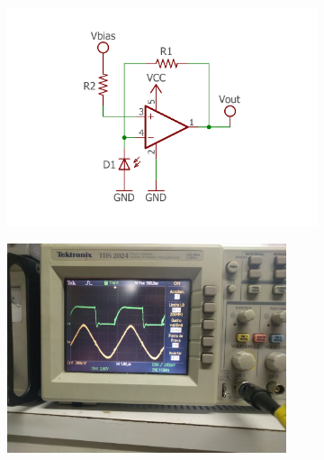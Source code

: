 	\begin{figure}[h]
		\caption{\label{fig_transimpedance_amp_complex_outer}Circuito e saída de um amplificador de impedâncias. No circuito, o fotodiodo é reversamente polarizado por $V_{bias}$. No osciloscópio, a saída está marcada em amarelo enquanto a saída do LED está em verde.}
		\begin{subfigure}{.5\textwidth}
			\centering
			\includegraphics[width=1\textwidth, trim={1cm 1cm 1cm 2cm}, clip]{circuits/transimpedance_amp.pdf}
		\end{subfigure}
		\begin{subfigure}{.5\textwidth}
			\centering
			\includegraphics[width=0.9\textwidth, trim={25cm 35cm 40cm 15cm}, clip]{circuits/photos/RX_TIA_result.jpg}
		\end{subfigure}
	\end{figure}

